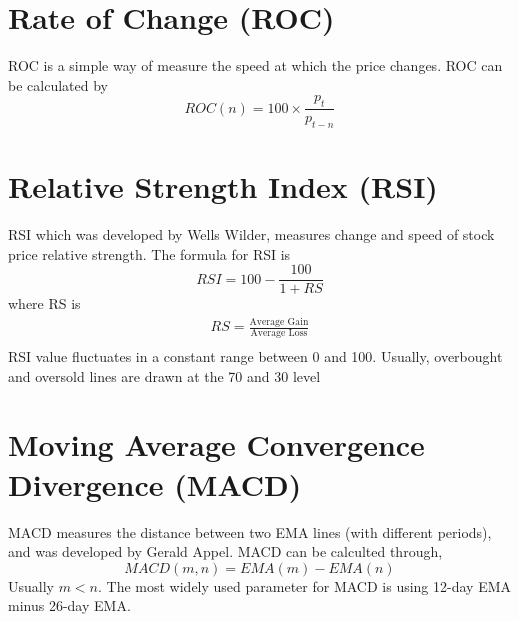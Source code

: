 \section{Rate of Change (ROC)}
ROC is a simple way of measure the speed at which the price changes\cite{pring2002technical}. ROC can be calculated by
\begin{equation}
	ROC(n) = 100\times\frac{p_t}{p_{t-n}}
\end{equation}


\section{Relative Strength Index (RSI)}
RSI which was developed by Wells Wilder, measures change and speed of stock price relative strength\cite{pring2002technical}. The formula for RSI is
\begin{equation}
RSI = 100 - \frac{100}{1 + RS}
\end{equation}
where RS is
\begin{gather*}
RS=\frac{\text{Average Gain}}{\text{Average Loss}}\\
\end{gather*}
RSI value fluctuates in a constant range between 0 and 100. Usually, overbought and oversold lines are drawn at the 70 and 30 level\cite{pring2002technical}

\section{Moving Average Convergence Divergence (MACD)}
MACD measures the distance between two EMA lines (with different periods), and was developed by Gerald Appel\cite{kahn2006technical}. MACD can be calculted through,
\begin{equation}
MACD(m,n)=EMA(m)-EMA(n)
\end{equation}
Usually $ m < n $. The most widely used parameter for MACD is using 12-day EMA minus 26-day EMA\cite{kahn2006technical}.